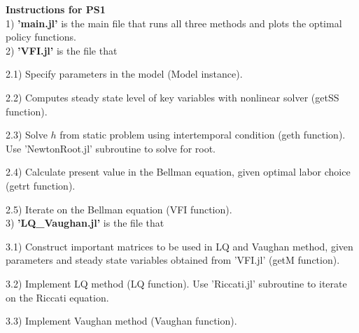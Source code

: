 \documentclass{article}
\begin{document}
	\noindent\textbf{\Large Instructions for PS1} \\
	
	1) \textbf{'main.jl'} is the main file that runs all three methods and plots the optimal policy functions.\\
	
	2) \textbf{'VFI.jl'} is the file that 
	
	\hspace{0.5 cm} 2.1) Specify parameters in the model (Model instance).

	\hspace{0.5 cm} 2.2) Computes steady state level of key variables with nonlinear solver (getSS function).
	
	\hspace{0.5 cm} 2.3) Solve $h$ from static problem using intertemporal condition (geth function). Use 'NewtonRoot.jl' subroutine to solve for root.
	
	\hspace{0.5 cm} 2.4) Calculate present value in the Bellman equation, given optimal labor choice (getrt function).
	
	\hspace{0.5 cm} 2.5) Iterate on the Bellman equation (VFI function).\\
	
	3) \textbf{'LQ\_Vaughan.jl'} is the file that 
	
	\hspace{0.5 cm} 3.1) Construct important matrices to be used in LQ and Vaughan method, given parameters and steady state variables obtained from 'VFI.jl' (getM function).
	
	\hspace{0.5 cm} 3.2) Implement LQ method (LQ function). Use 'Riccati.jl' subroutine to iterate on the Riccati equation.
	
	\hspace{0.5 cm} 3.3) Implement Vaughan method (Vaughan function).
\end{document}
